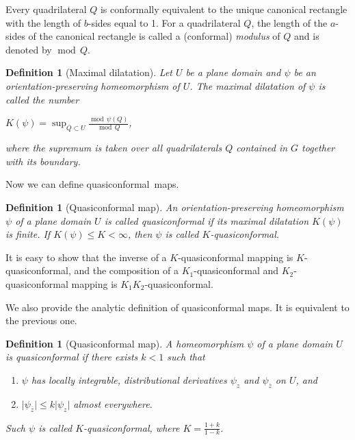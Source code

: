 \documentclass[10pt,reqno,a4paper]{amsart}
\numberwithin{figure}{section}
\numberwithin{equation}{section}
\newtheorem{defn}[thm]{Definition}
\newcommand{\qc}{quasiconformal}
\renewcommand{\mod}{\operatorname{mod\,}}
\newcommand{\abs}[1]{\lvert #1 \rvert}
\begin{document}
Every quadrilateral $Q$ is conformally equivalent to the unique canonical rectangle with the length of $b$-sides equal to 1. For a quadrilateral $Q$, the length of the $a$-sides of the canonical rectangle is called a (conformal) \emph{modulus} of $Q$ and is denoted by $\mod Q$. 

\begin{defn}[Maximal dilatation]
	Let $U$ be a plane domain and $\psi$ be an orientation-preserving homeomorphism of $U$. The \emph{maximal dilatation} of $\psi$ is called the number
	
	\begin{center}
		$K(\psi)=\sup_{\overline{Q}\subset U}\frac{\mod \psi(Q)}{\mod Q}$,\\
	\end{center}
	where the supremum is taken over all quadrilaterals $Q$ contained in $G$ together with its boundary.
\end{defn}

Now we can define \qc\ maps.

\begin{defn}[Quasiconformal map]
	An orientation-preserving homeomorphism $\psi$ of a plane domain $U$ is called quasiconformal if its maximal dilatation $K(\psi)$ is finite. If $K(\psi)\leq K<\infty$, then $\psi$ is called $K$-quasiconformal.
\end{defn}

It is easy to show that the inverse of a $K$-quasiconformal mapping is $K$-quasiconformal, and the composition of a $K_1$-quasiconformal and $K_2$-quasiconformal mapping is $K_1 K_2$-quasiconformal.

We also provide the analytic definition of quasiconformal maps. It is equivalent to the previous one.

\begin{defn}[Quasiconformal map]
	A homeomorphism $\psi$ of a plane domain $U$ is quasiconformal if there exists $k<1$ such that
	
	\begin{enumerate}
		\item $\psi$ has locally integrable, distributional derivatives $\psi_z$ and $\psi_{\overline{z}}$ on $U$, and
		\item $\abs{\psi_{\overline{z}}} \leq k\abs{\psi_z}$ almost everywhere.
	\end{enumerate}
	
	Such $\psi$ is called $K$-quasiconformal, where $K=\frac{1+k}{1-k}$.
\end{defn}
\end{document}
